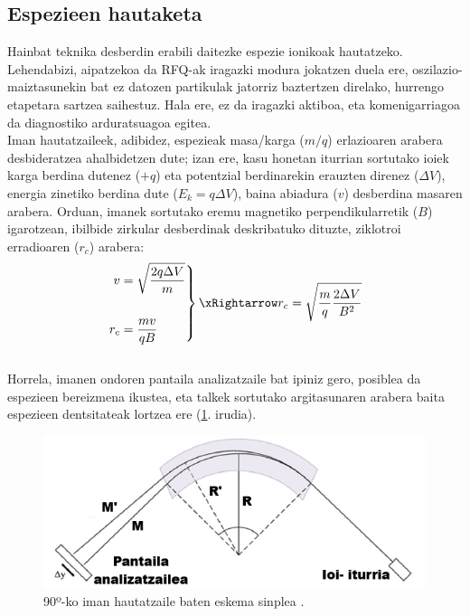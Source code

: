 \documentclass[12pt]{article}
\numberwithin{figure}{section}
\numberwithin{equation}{section}
\begin{document}
\subsection{Espezieen hautaketa}

Hainbat teknika desberdin erabili daitezke espezie ionikoak hautatzeko. Lehendabizi, aipatzekoa da RFQ-ak iragazki modura jokatzen duela ere, oszilazio\hyp{}{}maiztasunekin bat ez datozen partikulak jatorriz baztertzen direlako, hurrengo etapetara sartzea saihestuz. Hala ere, ez da iragazki aktiboa, eta komenigarriagoa da diagnostiko arduratsuagoa egitea.\\

Iman hautatzaileek, adibidez, espezieak masa/karga ($m/q$) erlazioaren arabera desbideratzea ahalbidetzen dute; izan ere, kasu honetan iturrian sortutako ioiek karga berdina dutenez ($+q$) eta potentzial berdinarekin erauzten direnez ($\Delta V$), energia zinetiko berdina dute ($E_k = q \Delta V$), baina abiadura ($v$) desberdina masaren arabera. Orduan, imanek sortutako eremu magnetiko perpendikularretik ($B$) igarotzean, ibilbide zirkular desberdinak deskribatuko dituzte, ziklotroi erradioaren ($r_c$) arabera:\\

\begin{equation}
\left.
\begin{aligned}
    v &= \sqrt{\frac{2q \Delta V}{m}}\\\\
    r_c &= \frac{mv}{qB}
\end{aligned}
\right\}
\xRightarrow \\
r_c = \sqrt{\frac{m}{q}\frac{2 \Delta V}{B^2}}
\label{eq:hautatzaile}
\end{equation} \\

Horrela, imanen ondoren pantaila analizatzaile bat ipiniz gero, posiblea da espezieen bereizmena ikustea, eta talkek sortutako argitasunaren arabera baita espezieen dentsitateak lortzea ere (\ref{fig:hautatzaile}. irudia).\\

\begin{figure}[h]
    \centering
    \includegraphics[width=0.5\linewidth]{1 - Sarrera/analizatzaile.png}
    \caption{90º-ko iman hautatzaile baten eskema sinplea \cite{lopes_mass_2011}.}
    \label{fig:hautatzaile}
\end{figure}
\end{document}
